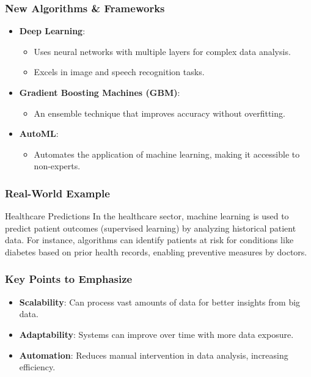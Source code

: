 \documentclass{beamer}
\begin{document}
\begin{frame}[fragile]
    \frametitle{New Algorithms \& Frameworks}
    \begin{itemize}
        \item \textbf{Deep Learning}: 
            \begin{itemize}
                \item Uses neural networks with multiple layers for complex data analysis.
                \item Excels in image and speech recognition tasks.
            \end{itemize}
        \item \textbf{Gradient Boosting Machines (GBM)}: 
            \begin{itemize}
                \item An ensemble technique that improves accuracy without overfitting.
            \end{itemize}
        \item \textbf{AutoML}:
            \begin{itemize}
                \item Automates the application of machine learning, making it accessible to non-experts.
            \end{itemize}
    \end{itemize}
\end{frame}

\begin{frame}[fragile]
    \frametitle{Real-World Example}
    \begin{block}{Healthcare Predictions}
        In the healthcare sector, machine learning is used to predict patient outcomes (supervised learning) by analyzing historical patient data. For instance, algorithms can identify patients at risk for conditions like diabetes based on prior health records, enabling preventive measures by doctors.
    \end{block}
\end{frame}

\begin{frame}[fragile]
    \frametitle{Key Points to Emphasize}
    \begin{itemize}
        \item \textbf{Scalability}: Can process vast amounts of data for better insights from big data.
        \item \textbf{Adaptability}: Systems can improve over time with more data exposure.
        \item \textbf{Automation}: Reduces manual intervention in data analysis, increasing efficiency.
    \end{itemize}
\end{frame}
\end{document}
